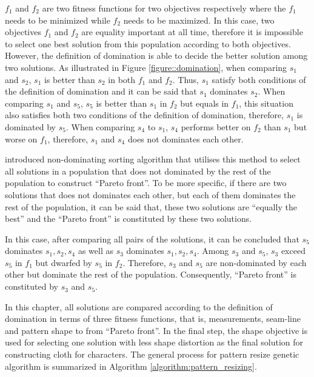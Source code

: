 $f_{1}$ and $f_{2}$ are two fitness functions for two objectives respectively where the $f_{1}$ needs to be minimized while $f_{2}$ needs to be maximized. In this case, two objectives $f_{1}$ and $f_{2}$ are equality important at all time, therefore it is impossible to select one best solution from this population according to both objectives. However, the definition of domination is able to decide the better solution among two solutions. As illustrated in Figure \ref{figure::domination}, when comparing $s_{1}$ and $s_{2}$, $s_{1}$ is better than $s_{2}$ in both $f_{1}$ and $f_{2}$. Thus, $s_{1}$ satisfy both conditions of the definition of domination and it can be said that $s_{1}$ dominates $s_{2}$. When comparing $s_{1}$ and $s_{5}$, $s_{5}$ is better than $s_{1}$ in $f_{2}$ but equals in $f_{1}$, this situation also satisfies both two conditions of the definition of domination, therefore, $s_{1}$ is dominated by $s_{5}$. When comparing $s_{4}$ to $s_{1}$, $s_{4}$ performs better on $f_{2}$ than $s_{1}$ but worse on $f_{1}$, therefore, $s_{1}$ and $s_{4}$ does not dominates each other. 

 introduced non-dominating sorting algorithm that utilises this method to select all solutions in a population that does not dominated by the rest of the population to construct ``Pareto front''. To be more specific, if there are two solutions that does not dominates each other, but each of them dominates the rest of the population, it can be said that, these two solutions are ``equally the best'' and the ``Pareto front'' is constituted by these two solutions.

In this case, after comparing all pairs of the solutions, it can be concluded that $s_{5}$ dominates $s_{1}, s_{2}, s_{4}$ as well as $s_{3}$ dominates $s_{1}, s_{2}, s_{4}$. Among $s_{3}$ and $s_{5}$, $s_{3}$ exceed $s_{5}$ in $f_{1}$ but dwarfed by $s_{5}$ in $f_{2}$. Therefore, $s_{3}$ and $s_{5}$ are non-dominated by each other but dominate the rest of the population. Consequently, ``Pareto front'' is constituted by $s_{3}$ and $s_{5}$. 

In this chapter, all solutions are compared according to the definition of domination in terms of three fitness functions, that is, measurements, seam-line and pattern shape to from ``Pareto front''. In the final step, the shape objective is used for selecting one solution with less shape distortion as the final solution for constructing cloth for characters. The general process for pattern resize genetic algorithm is summarized in Algorithm \ref{algorithm:pattern_resizing}.


